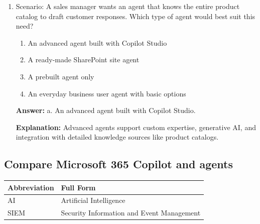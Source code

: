 \documentclass[10pt]{article}
\begin{document}
\begin{enumerate}[leftmargin=*]
\textbf{Answer:} Prebuilt agents \textrightarrow{} Created by Microsoft or approved vendors, ready to use; Ready-made SharePoint site agents \textrightarrow{} Automatically created for new SharePoint sites, scoped to site content; Agents for everyday business users \textrightarrow{} No programming required, limited capabilities, template or custom options; Advanced agents \textrightarrow{} Require programming skills, support custom connectors and generative AI.

\textbf{Explanation:} Each type serves different user needs and technical skill levels within Microsoft 365 Copilot.

\item Scenario: A sales manager wants an agent that knows the entire product catalog to draft customer responses. Which type of agent would best suit this need?
\begin{enumerate}[label=\alph*., leftmargin=1.5em]
\item An advanced agent built with Copilot Studio
\item A ready-made SharePoint site agent
\item A prebuilt agent only
\item An everyday business user agent with basic options
\end{enumerate}
\textbf{Answer:} a. An advanced agent built with Copilot Studio.

\textbf{Explanation:} Advanced agents support custom expertise, generative AI, and integration with detailed knowledge sources like product catalogs.

\end{enumerate}
\clearpage

\subsection{Compare Microsoft 365 Copilot and agents}

\begin{center}
\begin{tabular}{>{\raggedright\arraybackslash}p{} >{\raggedright\arraybackslash}p{}}
\toprule
\textbf{Abbreviation} & \textbf{Full Form} \\
\midrule
AI & Artificial Intelligence \\
SIEM & Security Information and Event Management \\
\end{tabular}
\end{center}
\end{document}
